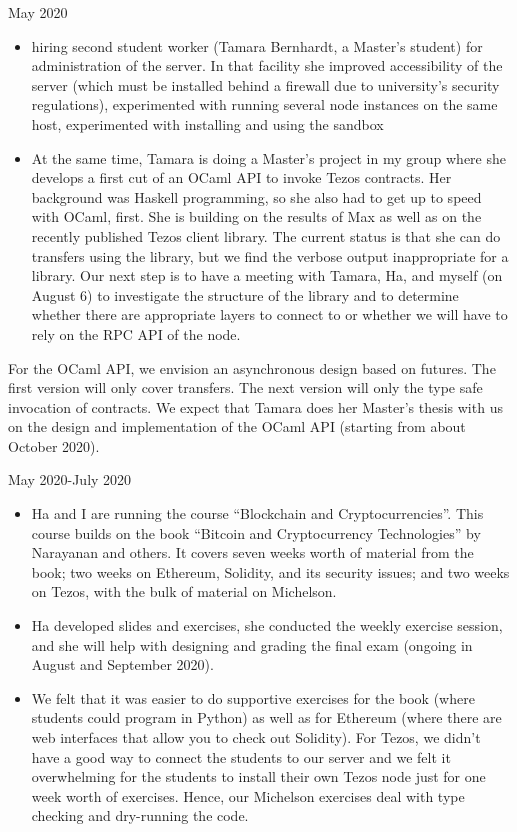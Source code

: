\documentclass[a4paper,11pt]{article}
\begin{document}
May 2020
\begin{itemize}
\item hiring second student worker (Tamara Bernhardt, a Master's student) for administration of the server. In that facility she improved accessibility of the server (which must be installed behind a firewall due to university's security regulations), experimented with running several node instances on the same host, experimented with installing and using the sandbox
\item At the same time, Tamara is doing a Master's project in my group where she develops a first cut of an OCaml API to invoke Tezos contracts. Her background was Haskell programming, so she also had to get up to speed with OCaml, first. She is building on the results of Max as well as on the recently published Tezos client library. The current status is that she can do transfers using the library, but we find the verbose output inappropriate for a library. Our next step is to have a meeting with Tamara, Ha, and myself (on August 6) to  investigate the structure of the library and to determine whether there are appropriate layers to connect to or whether we will have to rely on the RPC API of the node. 
\end{itemize}
For the OCaml API, we envision an asynchronous design based on futures. The first version will only cover transfers. The next version will only the type safe invocation of contracts. We expect that Tamara does her Master's thesis with us on the design and implementation of the OCaml API (starting from about October 2020). 

May 2020-July 2020
\begin{itemize}
\item Ha and I are running the course ``Blockchain and Cryptocurrencies''. This course builds on the book ``Bitcoin and Cryptocurrency Technologies'' by Narayanan and others.  It covers seven weeks worth of material from the book; two weeks on Ethereum, Solidity, and its security issues; and two weeks on Tezos, with the bulk of material on Michelson. 
\item Ha developed slides and exercises, she conducted the weekly exercise session, and she will help with designing and grading the final exam (ongoing in August and September 2020).
\item We felt that it was easier to do supportive exercises for the book (where students could program in Python) as well as for Ethereum (where there are web interfaces that allow you to check out Solidity). For Tezos, we didn't have a good way to connect the students to our server and we felt it overwhelming for the students to install their own Tezos node just for one week worth of exercises. Hence, our Michelson exercises deal with type checking and dry-running the code.
\end{itemize}
\end{document}
